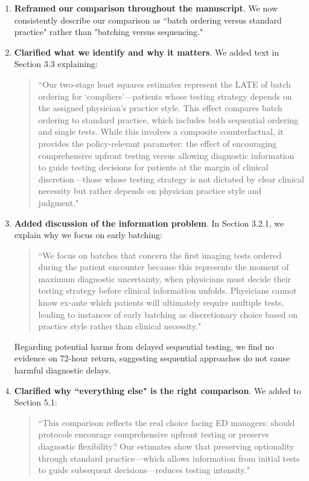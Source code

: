 \documentclass[11pt]{article}
\newcommand{\1}{\hbox{\rm 1\kern-.35em 1}}
\begin{document}
\begin{enumerate}
    \item \textbf{Reframed our comparison throughout the manuscript}. We now consistently describe our comparison as ``batch ordering versus standard practice" rather than "batching versus sequencing." 
    
    \item \textbf{Clarified what we identify and why it matters}. We added text in Section 3.3 explaining:
    \begin{quote}
    ``Our two-stage least squares estimates represent the LATE of batch ordering for `compliers'---patients whose testing strategy depends on the assigned physician's practice style. This effect compares batch ordering to standard practice, which includes both sequential ordering and single tests. While this involves a composite counterfactual, it provides the policy-relevant parameter: the effect of encouraging comprehensive upfront testing versus allowing diagnostic information to guide testing decisions for patients at the margin of clinical discretion—those whose testing strategy is not dictated by clear clinical necessity but rather depends on physician practice style and judgment."
    \end{quote}
    
    \item \textbf{Added discussion of the information problem}. In Section 3.2.1, we explain why we focus on early batching:
    \begin{quote}
    ``We focus on batches that concern the first imaging tests ordered during the patient encounter because this represents the moment of maximum diagnostic uncertainty, when physicians must decide their testing strategy before clinical information unfolds. Physicians cannot know ex-ante which patients will ultimately require multiple tests, leading to instances of early batching as discretionary choice based on practice style rather than clinical necessity."
    \end{quote}

Regarding potential harms from delayed sequential testing, we find no evidence on 72-hour return, suggesting sequential approaches do not cause harmful diagnostic delays.

\item \textbf{Clarified why ``everything else" is the right comparison}. We added to Section 5.1:
\begin{quote}
    ``This comparison reflects the real choice facing ED managers: should protocols encourage comprehensive upfront testing or preserve diagnostic flexibility? Our estimates show that preserving optionality through standard practice—which allows information from initial tests to guide subsequent decisions—reduces testing intensity."
\end{quote}
\end{enumerate}
\end{document}
